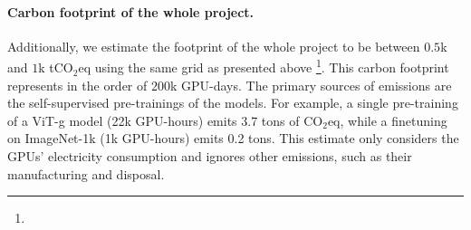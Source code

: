\paragraph{Carbon footprint of the whole project.} 
Additionally, we estimate the footprint of the whole project to be between $0.5$k and $1$k tCO$_2$eq using the same grid as presented above \footnote{}. 
This carbon footprint represents in the order of $200$k GPU-days.
The primary sources of emissions are the self-supervised pre-trainings of the models.
For example, a single pre-training of a ViT-g model (22k GPU-hours) emits 3.7 tons of CO$_2$eq, while a finetuning on ImageNet-1k (1k GPU-hours) emits 0.2 tons.
This estimate only considers the GPUs' electricity consumption and ignores other emissions, such as their manufacturing and disposal.

